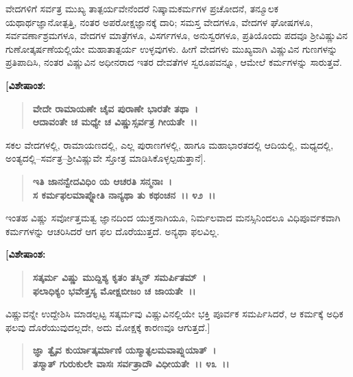 ವೇದಗಳಿಗೆ ಸರ್ವತ್ರ ಮುಖ್ಯ ತಾತ್ಪರ್ಯವೇನೆಂದರೆ ನಿಷ್ಕಾಮಕರ್ಮಗಳ ಪ್ರಚೋದನೆ, ತನ್ಮೂಲಕ ಯಥಾರ್ಥಜ್ಞಾನೋತ್ಪತ್ತಿ, ನಂತರ ಅಪರೋಕ್ಷಜ್ಞಾನಕ್ಕೆ ದಾರಿ; ಸಮಸ್ತ ವೇದಗಳೂ, ವೇದಗಳ ಘೋಷಗಳೂ, ಸರ್ವವರ್ಣಾಶ್ರಮಗಳೂ, ವೇದಗಳ ಮಾತ್ರೆಗಳೂ, ವಿಸರ್ಗಗಳೂ, ಅನುಸ್ವರಗಳೂ, ಪ್ರತಿಯೊಂದು ಪದವೂ ಶ‍್ರೀವಿಷ್ಣುವಿನ ಗುಣೋತ್ಕರ್ಷಣೆಯಲ್ಲಿಯೇ ಮಹಾತಾತ್ಪರ್ಯ ಉಳ್ಳವುಗಳು. ಹೀಗೆ ವೇದಗಳು ಮುಖ್ಯವಾಗಿ ವಿಷ್ಣುವಿನ ಗುಣಗಳನ್ನು ಪ್ರತಿಪಾದಿಸಿ, ನಂತರ ವಿಷ್ಣುವಿನ ಅಧೀನರಾದ ಇತರ ದೇವತೆಗಳ ಸ್ವರೂಪವನ್ನೂ, ಆಮೇಲೆ ಕರ್ಮಗಳನ್ನು ಸಾರುತ್ತವೆ.

\begin{flushleft}
\textbf{[ವಿಶೇಷಾಂಶ: }
\end{flushleft}

\begin{verse}
\textbf{ವೇದೇ ರಾಮಾಯಣೇ ಚೈವ ಪುರಾಣೇ ಭಾರತೇ ತಥಾ~।}\\\textbf{ಆದಾವಂತೇ ಚ ಮಧ್ಯೇ ಚ ವಿಷ್ಣುಸ್ಸರ್ವತ್ರ ಗೀಯತೇ~।।} 
\end{verse}

ಸಕಲ ವೇದಗಳಲ್ಲಿ, ರಾಮಾಯಣದಲ್ಲಿ, ಎಲ್ಲ ಪುರಾಣಗಳಲ್ಲಿ, ಹಾಗೂ ಮಹಾಭಾರತ\-ದಲ್ಲಿ ಆದಿಯಲ್ಲಿ, ಮಧ್ಯದಲ್ಲಿ, ಅಂತ್ಯದಲ್ಲಿ–ಸರ್ವತ್ರ–ಶ‍್ರೀವಿಷ್ಣುವೇ ಸ್ತೋತ್ರ ಮಾಡಿಸಿಕೊಳ್ಳಲ್ಪಡುತ್ತಾನೆ].

\begin{verse}
\textbf{ಇತಿ ಜಾನನ್ವೇದವಿಧಿಂ ಯ ಆಚರತಿ ಸನ್ಮನಾಃ~।}\\\textbf{ಸ ಕರ್ಮಫಲಮಾಪ್ನೋತಿ ನಾನ್ಯಥಾ ತು ಕಥಂಚನ~।। ೪೨~।।}
\end{verse}

ಇಂತಹ ವಿಷ್ಣು ಸರ್ವೋತ್ತಮತ್ವ ಜ್ಞಾನದಿಂದ ಯುಕ್ತನಾಗಿಯೂ, ನಿರ್ಮಲವಾದ ಮನಸ್ಸಿನಿಂದಲೂ ವಿಧಿಪೂರ್ವಕವಾಗಿ ಕರ್ಮಗಳನ್ನು ಆಚರಿಸಿದರೆ ಆಗ ಫಲ ದೊರೆಯುತ್ತದೆ. ಅನ್ಯಥಾ ಫಲವಿಲ್ಲ. 

\newpage

\begin{flushleft}
\textbf{[ವಿಶೇಷಾಂಶ:}
\end{flushleft}

\begin{verse}
\textbf{ಸತ್ಕರ್ಮ ವಿಷ್ಣು ಮುದ್ದಿಶ್ಯ ಕೃತಂ ತಸ್ಮಿನ್ ಸಮರ್ಪಿತಮ್~।}\\\textbf{ಫಲಾಧಿಕ್ಯಂ ಭವೇತ್ತಸ್ಯ ಮೋಕ್ಷಬೀಜಂ ಚ ಜಾಯತೇ~।।} 
\end{verse}

ವಿಷ್ಣುವನ್ನೇ ಉದ್ದೇಶಿಸಿ ಮಾಡಲ್ಪಟ್ಟ ಸತ್ಕರ್ಮವು ವಿಷ್ಣುವಿನಲ್ಲಿಯೇ ಭಕ್ತಿ ಪೂರ್ವಕ ಸಮರ್ಪಿಸಿದರೆ, ಆ ಕರ್ಮಕ್ಕೆ ಅಧಿಕ ಫಲವು ದೊರೆಯುವುದಲ್ಲದೇ, ಅದು ಮೋಕ್ಷಕ್ಕೆ ಕಾರಣವೂ ಆಗುತ್ತದೆ.]

\begin{verse}
\textbf{ಜ್ಞಾ ತ್ವೈವ ಕುರ್ಯಾತ್ಕರ್ಮಾಣಿ ಯಸ್ಮಾತ್ಫಲಮವಾಪ್ನುಯಾತ್~।}\\\textbf{ತಸ್ಮಾತ್ ಗುರುಕುಲೇ ವಾಸಃ ಸರ್ವತ್ರಾದೌ ವಿಧೀಯತೇ~।। ೪೩~।।}
\end{verse}


